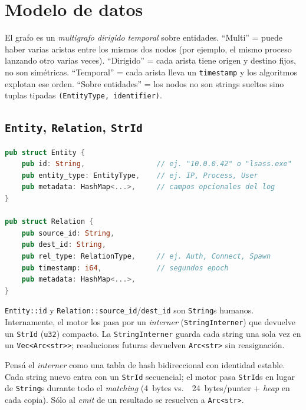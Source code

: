 \chapter{Modelo de datos}
\label{cap:datos}

\begin{intuicion}
El grafo es un \emph{multigrafo dirigido temporal} sobre entidades.
``Multi'' = puede haber varias aristas entre los mismos dos nodos
(por ejemplo, el mismo proceso lanzando otro varias veces). ``Dirigido''
= cada arista tiene origen y destino fijos, no son simétricas.
``Temporal'' = cada arista lleva un \texttt{timestamp} y los algoritmos
explotan ese orden. ``Sobre entidades'' = los nodos no son strings sueltos
sino tuplas tipadas \texttt{(EntityType, identifier)}.
\end{intuicion}

\section{\texttt{Entity}, \texttt{Relation}, \texttt{StrId}}

\begin{lstlisting}[language=Rust,caption={Tipos públicos del modelo. Los campos opcionales se omiten en el ejemplo para foco.}]
pub struct Entity {
    pub id: String,                 // ej. "10.0.0.42" o "lsass.exe"
    pub entity_type: EntityType,    // ej. IP, Process, User
    pub metadata: HashMap<...>,     // campos opcionales del log
}

pub struct Relation {
    pub source_id: String,
    pub dest_id: String,
    pub rel_type: RelationType,     // ej. Auth, Connect, Spawn
    pub timestamp: i64,             // segundos epoch
    pub metadata: HashMap<...>,
}
\end{lstlisting}

\texttt{Entity::id} y \texttt{Relation::source\_id}/\texttt{dest\_id}
son \texttt{String}s humanos. Internamente, el motor los pasa por un
\emph{interner} (\texttt{StringInterner}) que devuelve un
\texttt{StrId} (\texttt{u32}) compacto. La \texttt{StringInterner}
guarda cada string una sola vez en un \texttt{Vec<Arc<str>>};
resoluciones futuras devuelven \texttt{Arc<str>} sin reasignación.

\begin{intuicion}
Pensá el \emph{interner} como una tabla de hash bidireccional con
identidad estable. Cada string nuevo entra con un \texttt{StrId}
secuencial; el motor pasa \texttt{StrId}s en lugar de \texttt{String}s
durante todo el \emph{matching} (4~bytes vs.\ ~24~bytes/punter +
\emph{heap} en cada copia). Sólo al \emph{emit} de un resultado se
resuelven a \texttt{Arc<str>}.
\end{intuicion}

